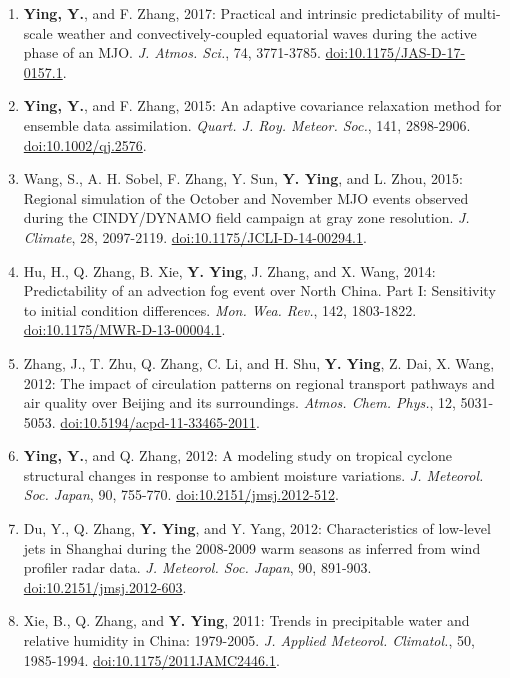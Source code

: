 \begin{enumerate}
\item \textbf{Ying, Y.}, and F. Zhang, 2017: Practical and intrinsic predictability of multi-scale weather and convectively-coupled equatorial waves during the active phase of an MJO. 
\textit{J. Atmos. Sci.}, 74, 3771-3785. 
\href{https://doi.org/10.1175/JAS-D-17-0157.1}{doi:10.1175/JAS-D-17-0157.1}.

\item \textbf{Ying, Y.}, and F. Zhang, 2015: An adaptive covariance relaxation method for ensemble data assimilation. 
\textit{Quart. J. Roy. Meteor. Soc.}, 141, 2898-2906. 
\href{https://doi.org/10.1002/qj.2576}{doi:10.1002/qj.2576}.

\item Wang, S., A. H. Sobel, F. Zhang, Y. Sun, \textbf{Y. Ying}, and L. Zhou, 2015: Regional simulation of the October and November MJO events observed during the CINDY/DYNAMO field campaign at gray zone resolution. 
\textit{J. Climate}, 28, 2097-2119. 
\href{https://doi.org/10.1175/JCLI-D-14-00294.1}{doi:10.1175/JCLI-D-14-00294.1}.

\item Hu, H., Q. Zhang, B. Xie, \textbf{Y. Ying}, J. Zhang, and X. Wang, 2014: Predictability of an advection fog event over North China. Part I: Sensitivity to initial condition differences. 
\textit{Mon. Wea. Rev.}, 142, 1803-1822. 
\href{https://doi.org/10.1175/MWR-D-13-00004.1}{doi:10.1175/MWR-D-13-00004.1}.

\item Zhang, J., T. Zhu, Q. Zhang, C. Li, and H. Shu, \textbf{Y. Ying}, Z. Dai, X. Wang, 2012: The impact of circulation patterns on regional transport pathways and air quality over Beijing and its surroundings. 
\textit{Atmos. Chem. Phys.}, 12, 5031-5053. 
\href{https://doi.org/10.5194/acpd-11-33465-2011}{doi:10.5194/acpd-11-33465-2011}.

\item \textbf{Ying, Y.}, and Q. Zhang, 2012: A modeling study on tropical cyclone structural changes in response to ambient moisture variations. 
\textit{J. Meteorol. Soc. Japan}, 90, 755-770. 
\href{https://doi.org/10.2151/jmsj.2012-512}{doi:10.2151/jmsj.2012-512}.

\item Du, Y., Q. Zhang, \textbf{Y. Ying}, and Y. Yang, 2012: Characteristics of low-level jets in Shanghai during the 2008-2009 warm seasons as inferred from wind profiler radar data. 
\textit{J. Meteorol. Soc. Japan}, 90, 891-903. 
\href{https://doi.org/10.2151/jmsj.2012-603}{doi:10.2151/jmsj.2012-603}.

\item Xie, B., Q. Zhang, and \textbf{Y. Ying}, 2011: Trends in precipitable water and relative humidity in China: 1979-2005. 
\textit{J. Applied Meteorol. Climatol.}, 50, 1985-1994. 
\href{https://doi.org/10.1175/2011JAMC2446.1}{doi:10.1175/2011JAMC2446.1}.

\end{enumerate}
